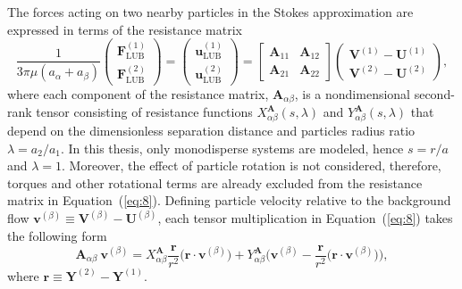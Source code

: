 \documentclass[../thesis.tex]{subfiles}
\begin{document}
The forces acting on two nearby particles in the Stokes approximation are expressed in terms of the resistance matrix \citep{JO84}
\begin{equation}
\frac{1}{3\pi \mu(a_\alpha+a_\beta)}
{\begin{pmatrix}
{\boldsymbol{F}^{(1)}_{\text{LUB}}} \\
{\boldsymbol{F}^{(2)}_{\text{LUB}}}
\end{pmatrix}}
=
\begin{pmatrix}
{\boldsymbol{u}^{(1)}_{\text{LUB}}} \\
{\boldsymbol{u}^{(2)}_{\text{LUB}}}
\end{pmatrix}
=
\begin{bmatrix}
\boldsymbol{A}_{11} & \boldsymbol{A}_{12} \\
\boldsymbol{A}_{21} & \boldsymbol{A}_{22}
\end{bmatrix}
\begin{pmatrix}
\boldsymbol{V}^{(1)} - \boldsymbol{U}^{(1)} \\
\boldsymbol{V}^{(2)} - \boldsymbol{U}^{(2)}
\end{pmatrix},
\label{eq:8}
\end{equation}
where each component of the resistance matrix, $\boldsymbol{A}_{\alpha\beta}$, is a nondimensional second-rank tensor consisting of resistance functions $X^{\boldsymbol{A}}_{\alpha\beta}(s,\lambda)$ and $Y^{\boldsymbol{A}}_{\alpha\beta}(s,\lambda)$ that depend on the dimensionless separation distance and particles radius ratio $\lambda={a_2}/{a_1}$. In this thesis, only monodisperse systems are modeled, hence $s=r/a$ and $\lambda=1$. Moreover, the effect of particle rotation is not considered, therefore, torques and other rotational terms are already excluded from the resistance matrix in Equation~(\ref{eq:8}). Defining particle velocity relative to the background flow $\boldsymbol{v}^{(\beta)}\equiv\boldsymbol{V}^{(\beta)}-\boldsymbol{U}^{(\beta)}$, each tensor multiplication in Equation~(\ref{eq:8}) takes the following form
\begin{equation}
\boldsymbol{A}_{\alpha\beta}\:\boldsymbol{v}^{(\beta)}
=
X^{\boldsymbol{A}}_{\alpha\beta}\frac{\boldsymbol{r}}{r^2}\Big(\boldsymbol{r \cdot v}^{(\beta)}\Big)
+
Y^{\boldsymbol{A}}_{\alpha\beta}\bigg(\boldsymbol{v}^{(\beta)}-\frac{\boldsymbol{r}}{r^2}\Big(\boldsymbol{r \cdot v}^{(\beta)}\Big)\bigg),
\label{eq:9}
\end{equation}
where $\boldsymbol{r}\equiv\boldsymbol{Y}^{(2)}-\boldsymbol{Y}^{(1)}$. 
\end{document}
